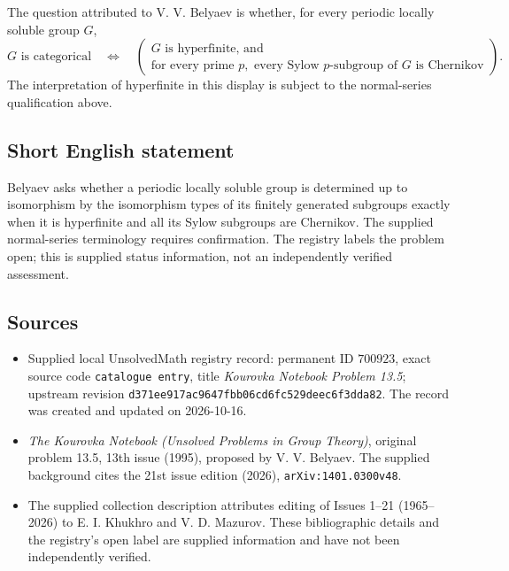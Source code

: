 \documentclass[11pt]{article}
\begin{document}
The question attributed to V. V. Belyaev is whether, for every periodic locally soluble group \(G\),
\[
G\text{ is categorical}
\quad\Longleftrightarrow\quad
\left(\begin{gathered}
G\text{ is hyperfinite, and}\\
\text{for every prime }p,\text{ every Sylow }p\text{-subgroup of }G
\text{ is Chernikov}
\end{gathered}\right).
\]
The interpretation of hyperfinite in this display is subject to the normal-series qualification above.
\subsection{Short English statement}
Belyaev asks whether a periodic locally soluble group is determined up to isomorphism by the isomorphism types of its finitely generated subgroups exactly when it is hyperfinite and all its Sylow subgroups are Chernikov. The supplied normal-series terminology requires confirmation. The registry labels the problem open; this is supplied status information, not an independently verified assessment.
\subsection{Sources}
\begin{itemize}
\item Supplied local UnsolvedMath registry record: permanent ID \(700923\), exact source code \texttt{catalogue entry}, title \emph{Kourovka Notebook Problem 13.5}; upstream revision \texttt{d371ee917ac9647fbb06cd6fc529deec6f3dda82}. The record was created and updated on 2026-10-16.
\item \emph{The Kourovka Notebook (Unsolved Problems in Group Theory)}, original problem 13.5, 13th issue (1995), proposed by V. V. Belyaev. The supplied background cites the 21st issue edition (2026), \texttt{arXiv:1401.0300v48}.
\item The supplied collection description attributes editing of Issues 1--21 (1965--2026) to E. I. Khukhro and V. D. Mazurov. These bibliographic details and the registry's open label are supplied information and have not been independently verified.
\end{itemize}
\end{document}
